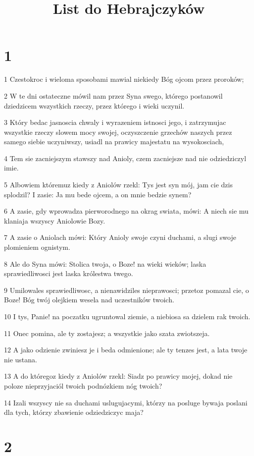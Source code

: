 

\title{List do Hebrajczyków}


\chapter{1}

\par 1 Czestokroc i wieloma sposobami mawial niekiedy Bóg ojcom przez proroków;
\par 2 W te dni ostateczne mówil nam przez Syna swego, którego postanowil dziedzicem wszystkich rzeczy, przez którego i wieki uczynil.
\par 3 Który bedac jasnoscia chwaly i wyrazeniem istnosci jego, i zatrzymujac wszystkie rzeczy slowem mocy swojej, oczyszczenie grzechów naszych przez samego siebie uczyniwszy, usiadl na prawicy majestatu na wysokosciach,
\par 4 Tem sie zacniejszym stawszy nad Anioly, czem zacniejsze nad nie odziedziczyl imie.
\par 5 Albowiem któremuz kiedy z Aniolów rzekl: Tys jest syn mój, jam cie dzis splodzil? I zasie: Ja mu bede ojcem, a on mnie bedzie synem?
\par 6 A zasie, gdy wprowadza pierworodnego na okrag swiata, mówi: A niech sie mu klaniaja wszyscy Aniolowie Bozy.
\par 7 A zasie o Aniolach mówi: Który Anioly swoje czyni duchami, a slugi swoje plomieniem ognistym.
\par 8 Ale do Syna mówi: Stolica twoja, o Boze! na wieki wieków; laska sprawiedliwosci jest laska królestwa twego.
\par 9 Umilowales sprawiedliwosc, a nienawidziles nieprawosci; przetoz pomazal cie, o Boze! Bóg twój olejkiem wesela nad uczestników twoich.
\par 10 I tys, Panie! na poczatku ugruntowal ziemie, a niebiosa sa dzielem rak twoich.
\par 11 Onec pomina, ale ty zostajesz; a wszystkie jako szata zwiotszeja.
\par 12 A jako odzienie zwiniesz je i beda odmienione; ale ty tenzes jest, a lata twoje nie ustana.
\par 13 A do któregoz kiedy z Aniolów rzekl: Siadz po prawicy mojej, dokad nie poloze nieprzyjaciól twoich podnózkiem nóg twoich?
\par 14 Izali wszyscy nie sa duchami uslugujacymi, którzy na posluge bywaja poslani dla tych, którzy zbawienie odziedziczyc maja?

\chapter{2}

